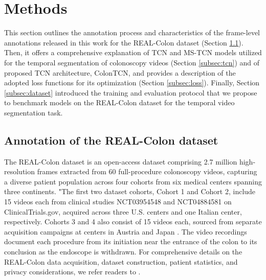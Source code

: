 \section{Methods}
\label{sec:met}
This section outlines the annotation process and characteristics of the frame-level annotations released in this work for the REAL-Colon dataset (Section \ref{subsec:realcolon}). Then, it offers a comprehensive explanation of TCN and MS-TCN models utilized for the temporal segmentation of colonoscopy videos (Section \ref{subsec:tcn}) and of proposed TCN architecture, ColonTCN, and provides a description of the adopted loss functions for its optimization (Section \ref{subsec:loss}). Finally, Section \ref{subsec:dataset} introduced the training and evaluation protocol that we propose to benchmark models on the REAL-Colon dataset for the temporal video segmentation task.

\subsection{Annotation of the REAL-Colon dataset}
\label{subsec:realcolon}
The REAL-Colon dataset \cite{biffi2024real} is an open-access dataset comprising 2.7 million high-resolution frames extracted from 60 full-procedure colonoscopy videos, capturing a diverse patient population across four cohorts from six medical centers spanning three continents. "The first two dataset cohorts, Cohort 1 and Cohort 2, include 15 videos each from clinical studies NCT03954548 and NCT04884581 on ClinicalTrials.gov, acquired across three U.S. centers and one Italian center, respectively. Cohorts 3 and 4 also consist of 15 videos each, sourced from separate acquisition campaigns at centers in Austria and Japan \cite{biffi2024real}. The video recordings document each procedure from its initiation near the entrance of the colon to its conclusion as the endoscope is withdrawn. For comprehensive details on the REAL-Colon data acquisition, dataset construction, patient statistics, and privacy considerations, we refer readers to \cite{biffi2024real}.




